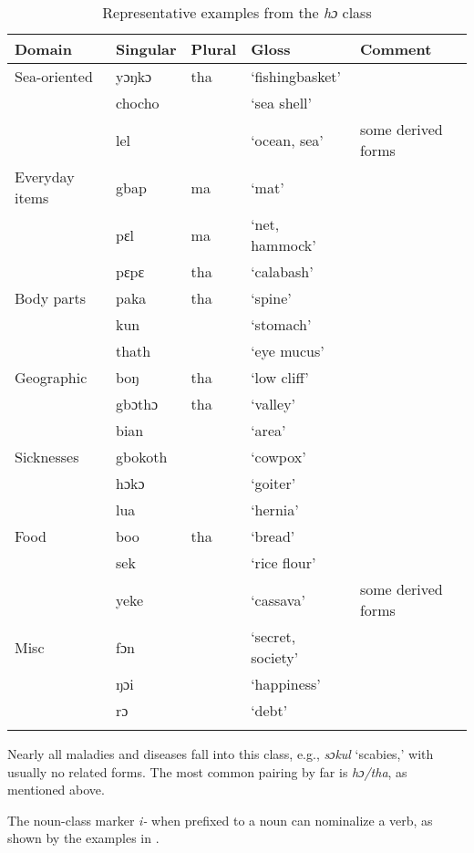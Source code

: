 \begin{table}
\caption{\label{tab:nounclass:38}Representative examples from the \textit{hɔ} class}


\begin{tabularx}{\textwidth}{lllQl}
\lsptoprule
Domain & Singular & Plural & Gloss & Comment\\
\midrule
Sea-oriented & yɔŋkɔ & tha  & ‘fishingbasket'\\
&  chocho & & ‘sea shell'  &\\
&  lel & & ‘ocean, sea' & some derived forms\\
\tablevspace
Everyday items & gbap & ma & ‘mat' & \\
&  pɛl & ma & ‘net, hammock' &\\ 
& pɛpɛ & tha & ‘calabash'\\
\tablevspace

Body parts & paka & tha & ‘spine' &\\
& kun &  & ‘stomach' &\\
& thath &  & ‘eye mucus' &\\

\tablevspace
Geographic & boŋ & tha & ‘low cliff' &\\
& gbɔthɔ & tha & ‘valley' &\\
& bian &  &‘area'  &\\
\tablevspace
Sicknesses  & gbokoth &  & ‘cowpox'  &\\
& hɔkɔ &  & ‘goiter' &\\
& lua &  & ‘hernia' &\\
\tablevspace
Food  & boo & tha & ‘bread'\\
& sek &  & ‘rice flour' &\\
& yeke & & ‘cassava' & some derived forms\\
\tablevspace
Misc & fɔn &  & ‘secret, society'  &\\
& ŋɔi &  & ‘happiness' &\\
& rɔ &  & ‘debt' &\\
\lspbottomrule
\end{tabularx}
\end{table}

Nearly all maladies and diseases fall into this class, e.g., \textit{sɔkul} ‘scabies,' with usually no related forms. The most common pairing by far is \textit{hɔ/tha}, as mentioned above.

The noun-class marker \textit{i-} when prefixed to a noun can nominalize a verb, as shown by the examples in .

